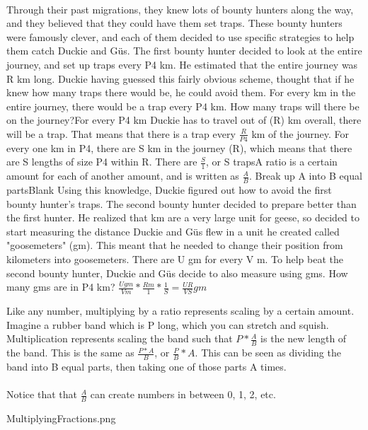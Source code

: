 \documentclass[a4paper,11pt ]{book}
\begin{document}
\paragraph{} Through their past migrations, they knew lots of bounty hunters along the way, and they believed that they could have them set traps. These bounty hunters were famously clever, and each of them decided to use specific strategies to help them catch Duckie and Güs.
\vfill
\pagebreak
{The first bounty hunter decided to look at the entire journey, and set up traps every P4 km. He estimated that the entire journey was R km long. Duckie having guessed this fairly obvious scheme,  thought that if he knew how many traps there would be, he could avoid them. For every km in the entire journey, there would be a trap every P4 km. How many traps will there be on the journey?}{For every P4 km Duckie has to travel out of (R) km overall, there will be a trap. That means that there is a trap every $\frac{R}{P4}$ km of the journey. For every one km in P4, there are S km in the journey (R), which means that there are S lengths of size P4 within R. There are $\frac{S}{1}$, or S traps}{A ratio is a certain amount for each of another amount, and is written as $\frac{A}{B}$. Break up A into B equal parts}{Blank}
{Using this knowledge, Duckie figured out how to avoid the first bounty hunter's traps. The second bounty hunter decided to prepare better than the first hunter. He realized that km are a very large unit for geese, so decided to start measuring the distance Duckie and Güs flew in a unit he created called "goosemeters" (gm). This meant that he needed to change their position from kilometers into goosemeters. There are U gm for every V m. To help beat the second bounty hunter, Duckie and Güs decide to also measure using gms. How many gms are in P4 km?}{
$\frac{Ugm}{Vm}*\frac{Rm}{1}*\frac{1}{S}=\frac{UR}{VS} gm$
}{Like any number, multiplying by a ratio represents scaling by a certain amount. Imagine a rubber band which is P long, which you can stretch and squish. Multiplication represents scaling the band such that $P*\frac{A}{B}$ is the new length of the band. This is the same as $\frac{P*A}{B}$, or $\frac{P}{B}*A$. This can be seen as dividing the band into B equal parts, then taking one of those parts A times. \paragraph{} Notice that that $\frac{A}{B}$ can create numbers in between 0, 1, 2, etc.}{MultiplyingFractions.png}
\end{document}
